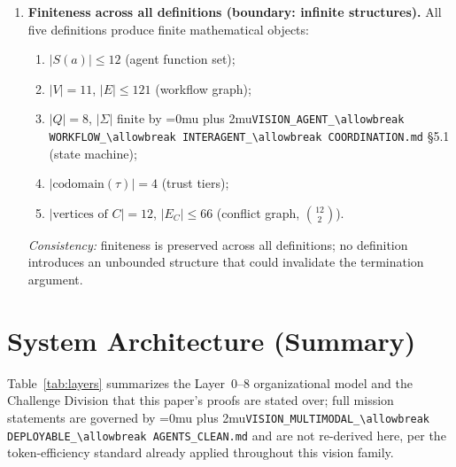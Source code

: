 \documentclass[12pt]{article}
\theoremstyle{definition}
\DeclareRobustCommand{\code}[1]{\begingroup\Urlmuskip=0mu plus 2mu\relax\nolinkurl{#1}\endgroup}
\newcommand{\VisionClean}{\code{VISION\_MULTIMODAL\_\allowbreak DEPLOYABLE\_\allowbreak AGENTS\_CLEAN.md}}
\newcommand{\VisionFlow}{\code{VISION\_AGENT\_\allowbreak WORKFLOW\_\allowbreak INTERAGENT\_\allowbreak COORDINATION.md}}
\begin{document}
\begin{enumerate}[label=\textbf{X\arabic*.}, leftmargin=*, widest=X9]
  \item \textbf{Finiteness across all definitions (boundary:
        infinite structures).}
        All five definitions produce finite mathematical objects:
        \begin{enumerate}[label=(\alph*), leftmargin=*]
          \item $|S(a)| \leq 12$ (agent function set);
          \item $|V| = 11$, $|E| \leq 121$ (workflow graph);
          \item $|Q| = 8$, $|\Sigma|$ finite by \VisionFlow{}
                \S5.1 (state machine);
          \item $|\text{codomain}(\tau)| = 4$ (trust tiers);
          \item $|\text{vertices of }C| = 12$,
                $|E_C| \leq 66$ (conflict graph, $\binom{12}{2}$).
        \end{enumerate}
        \emph{Consistency:} finiteness is preserved across all
        definitions; no definition introduces an unbounded structure
        that could invalidate the termination argument.

\end{enumerate}

\section{System Architecture (Summary)}
\label{sec:architecture}

Table~\ref{tab:layers} summarizes the Layer~0--8 organizational model and
the Challenge Division that this paper's proofs are stated over; full
mission statements are governed by \VisionClean{} and are not re-derived here, per the token-efficiency
standard already applied throughout this vision family.
\end{document}
